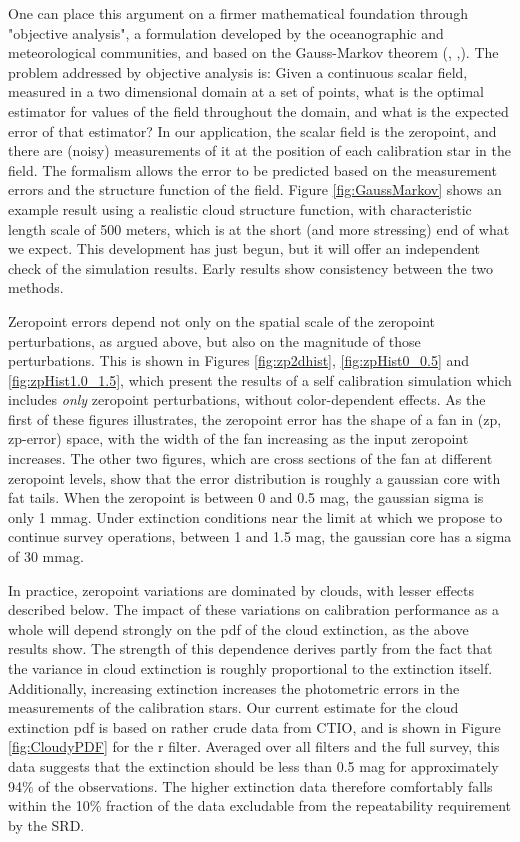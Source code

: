 \documentclass[12pt,preprint]{aastex}
\begin{document}
One can place this argument on a firmer mathematical foundation through "objective analysis", a formulation developed by the 
oceanographic and meteorological communities, and based on the Gauss-Markov theorem (\citep{Bretherton1976}, 
\citep{Bretherton1980},\citep{McIntosh1990}).
The problem addressed by objective analysis is:  Given a continuous scalar field, measured in a two dimensional domain at a set of 
points, what is the optimal estimator for values of the field throughout the domain, and what is the expected error of that estimator?
In our application, the scalar field is the zeropoint, and there are (noisy) measurements of it at the position of each calibration
star in the field.  The formalism allows the error to be predicted based on the measurement errors and the structure function
of the field.  Figure \ref{fig:GaussMarkov} shows an example result using a realistic cloud structure function, with 
characteristic length scale of 500 meters, which is at the short (and more stressing) end of what we expect.  This development
has just begun, but it will offer an independent check of the simulation results.  Early results show consistency between
the two methods.


Zeropoint errors depend not only on the spatial scale of the zeropoint perturbations, as argued above,
but also on the magnitude of those perturbations.   This is shown in Figures \ref{fig:zp2dhist}, \ref{fig:zpHist0_0.5} and 
\ref{fig:zpHist1.0_1.5}, which present
the results of a self calibration simulation which includes {\it only} zeropoint perturbations, without
color-dependent effects.  As the first of these figures illustrates, the zeropoint error has the shape of a fan
in (zp, zp-error) space, with the width of the fan increasing as the input zeropoint increases.  The other two
figures, which are cross sections of the fan at different zeropoint levels, show that the error distribution
is roughly a gaussian core with fat tails.  When the zeropoint is between 0 and 0.5 mag, the gaussian sigma is only
1 mmag.  Under extinction conditions near the limit at which we propose to continue survey operations, between
1 and 1.5 mag, the gaussian core has a sigma of 30 mmag.

In practice, zeropoint variations are dominated by clouds, with lesser effects described below.
The impact of these variations on calibration performance as a whole will depend strongly on
the pdf of the cloud extinction, as the above results show.  The strength of this dependence derives partly from the fact that
the variance in cloud extinction is roughly proportional to the extinction itself.  Additionally, 
increasing extinction increases the photometric errors in the measurements of the
calibration stars.  Our current estimate for the cloud extinction pdf is based on rather crude data from CTIO, and is shown in Figure
\ref{fig:CloudyPDF} for the r filter.  Averaged over all filters and the full survey, this data suggests that the extinction should be 
less than 0.5 mag for approximately 94\% of the observations.
The higher extinction data therefore comfortably falls within the 10\% fraction of the data excludable
from the repeatability requirement by the SRD.
\end{document}

